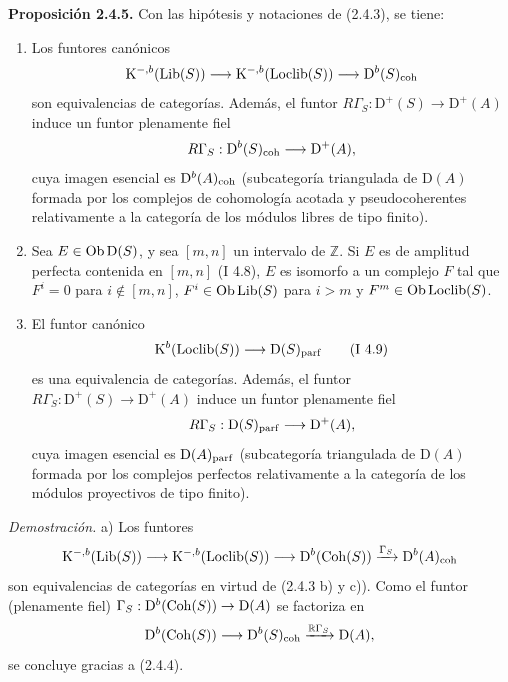 \providecommand{\sisi}[2]{#2}

\textbf{Proposición 2.4.5.} Con las hipótesis y notaciones de (2.4.3), se tiene:
\begin{enumerate}[label=\alph*)]
\item Los funtores canónicos
\[
\mathrm K^{-,b}(\operatorname{Lib}(S))\longrightarrow\mathrm K^{-,b}(\operatorname{Loclib}(S))\longrightarrow\mathrm D^b(S)_{\mathrm{coh}}
\]
son equivalencias de categorías. Además, el funtor $R\Gamma_S:\mathrm D^+(S)\to\mathrm D^+(A)$ induce un funtor plenamente fiel
\[
R\Gamma_S\sisi{=}{:}\mathrm D^b(S)_{\coh}\longrightarrow\mathrm D^+(A),
\]
cuya imagen esencial es $\mathrm D^b(A)_{\mathrm{coh}}$ (subcategoría triangulada de $\mathrm D(A)$ formada por los complejos de cohomología acotada y pseudocoherentes relativamente a la categoría de los módulos libres de tipo finito).
\item Sea $E\in\operatorname{Ob}\mathrm D(S)$, y sea $[m,n]$ un intervalo de $\mathbb Z$. Si $E$ es de amplitud perfecta contenida en $[m,n]$ (I 4.8), $E$ es isomorfo a un complejo $F$ tal que $F^i=0$ para $i\sisi{\in}{\notin}[m,n]$, $F^i\in\operatorname{Ob}\operatorname{Lib}(S)$ para $i>m$ y $F^m\in\operatorname{Ob}\operatorname{Loclib}(S)$.
\item El funtor canónico
\[
\mathrm K^b(\operatorname{Loclib}(S))\longrightarrow\mathrm D(S)_{\mathrm{parf}}\qquad(\text{I }4.9)
\]
es una equivalencia de categorías. Además, el funtor $R\Gamma_S:\mathrm D^+(S)\to\mathrm D^+(A)$ induce un funtor plenamente fiel
\[
R\Gamma_S:\mathrm D(S)_{\mathrm{parf}}\longrightarrow\mathrm D^+(A),
\]
cuya imagen esencial es $\mathrm D(A)_{\mathrm{parf}}$ (subcategoría triangulada de $\mathrm D(A)$ formada por los complejos perfectos relativamente a la categoría de los módulos proyectivos de tipo finito).
\end{enumerate}

\emph{Demostración.} a) Los funtores
\[
\mathrm K^{-,b}(\operatorname{Lib}(S))\longrightarrow\mathrm K^{-,b}(\operatorname{Loclib}(S))\longrightarrow\mathrm D^b(\operatorname{Coh}(S))\xrightarrow{\Gamma_S}\mathrm D^b(A)_{\mathrm{coh}}
\]
son equivalencias de categorías en virtud de (2.4.3 b) y c)). Como el funtor (plenamente fiel) $\Gamma_S:\mathrm D^b(\operatorname{Coh}(S))\to\mathrm D(A)$ se factoriza en
\[
\mathrm D^b(\operatorname{Coh}(S))\longrightarrow\mathrm D^b(S)_{\mathrm{coh}}\xrightarrow{\mathbb R\Gamma_S}\mathrm D(A),
\]
se concluye gracias a (2.4.4).

